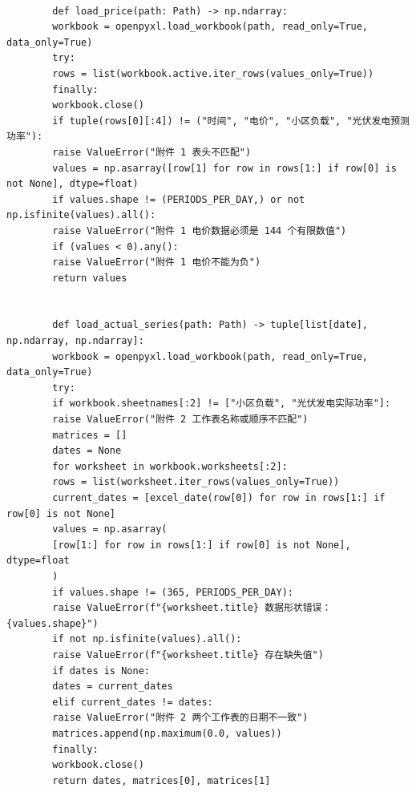 \documentclass[UTF8]{ctexart}
\begin{document}
\begin{verbatim}
        
        def load_price(path: Path) -> np.ndarray:
        workbook = openpyxl.load_workbook(path, read_only=True, data_only=True)
        try:
        rows = list(workbook.active.iter_rows(values_only=True))
        finally:
        workbook.close()
        if tuple(rows[0][:4]) != ("时间", "电价", "小区负载", "光伏发电预测功率"):
        raise ValueError("附件 1 表头不匹配")
        values = np.asarray([row[1] for row in rows[1:] if row[0] is not None], dtype=float)
        if values.shape != (PERIODS_PER_DAY,) or not np.isfinite(values).all():
        raise ValueError("附件 1 电价数据必须是 144 个有限数值")
        if (values < 0).any():
        raise ValueError("附件 1 电价不能为负")
        return values
        
        
        def load_actual_series(path: Path) -> tuple[list[date], np.ndarray, np.ndarray]:
        workbook = openpyxl.load_workbook(path, read_only=True, data_only=True)
        try:
        if workbook.sheetnames[:2] != ["小区负载", "光伏发电实际功率"]:
        raise ValueError("附件 2 工作表名称或顺序不匹配")
        matrices = []
        dates = None
        for worksheet in workbook.worksheets[:2]:
        rows = list(worksheet.iter_rows(values_only=True))
        current_dates = [excel_date(row[0]) for row in rows[1:] if row[0] is not None]
        values = np.asarray(
        [row[1:] for row in rows[1:] if row[0] is not None], dtype=float
        )
        if values.shape != (365, PERIODS_PER_DAY):
        raise ValueError(f"{worksheet.title} 数据形状错误：{values.shape}")
        if not np.isfinite(values).all():
        raise ValueError(f"{worksheet.title} 存在缺失值")
        if dates is None:
        dates = current_dates
        elif current_dates != dates:
        raise ValueError("附件 2 两个工作表的日期不一致")
        matrices.append(np.maximum(0.0, values))
        finally:
        workbook.close()
        return dates, matrices[0], matrices[1]
        

\end{verbatim}
\end{document}
